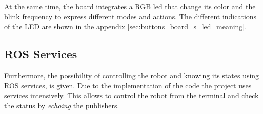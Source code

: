 	At the same time, the board integrates a RGB led that change its color and the blink frequency to express different modes and actions.
	The different indications of the LED are shown in the appendix \ref{sec:buttons_board_s_led_meaning}.

	\subsection{ROS Services} %
	\label{sub:mr_ros_services}
	Furthermore, the possibility of controlling the robot and knowing its states using ROS services, is given.
	Due to the implementation of the code the project uses services intensively.
	This allows to control the robot from the terminal and check the status by \emph{echoing} the publishers.


